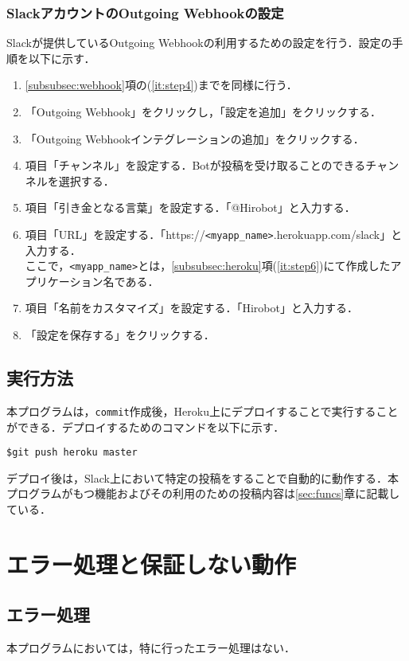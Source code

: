 \documentclass[12pt]{jsarticle}
\begin{document}
\subsubsection{SlackアカウントのOutgoing Webhookの設定}
Slackが提供しているOutgoing Webhook\cite{slack-outgoing}の利用するための設定を行う．設定の手順を以下に示す．
\begin{enumerate}
\item \ref{subsubsec:webhook}項の(\ref{it:step4})までを同様に行う．
\item 「Outgoing Webhook」をクリックし，「設定を追加」をクリックする．
\item 「Outgoing Webhookインテグレーションの追加」をクリックする．
\item 項目「チャンネル」を設定する．Botが投稿を受け取ることのできるチャンネルを選択する．
\item 項目「引き金となる言葉」を設定する．「@Hirobot」と入力する．
\item 項目「URL」を設定する．「https://\verb|<myapp_name>|.herokuapp.com/slack」と入力する．\\
  ここで，\verb|<myapp_name>|とは，\ref{subsubsec:heroku}項(\ref{it:step6})にて作成したアプリケーション名である．
\item 項目「名前をカスタマイズ」を設定する．「Hirobot」と入力する．
\item 「設定を保存する」をクリックする．
\end{enumerate}

\subsection{実行方法}
本プログラムは，\verb|commit|作成後，Heroku上にデプロイすることで実行することができる．デプロイするためのコマンドを以下に示す．
\begin{verbatim}
$git push heroku master
\end{verbatim}

デプロイ後は，Slack上において特定の投稿をすることで自動的に動作する．本プログラムがもつ機能およびその利用のための投稿内容は\ref{sec:funcs}章に記載している．

\section{エラー処理と保証しない動作}

\subsection{エラー処理}
本プログラムにおいては，特に行ったエラー処理はない．
\end{document}
